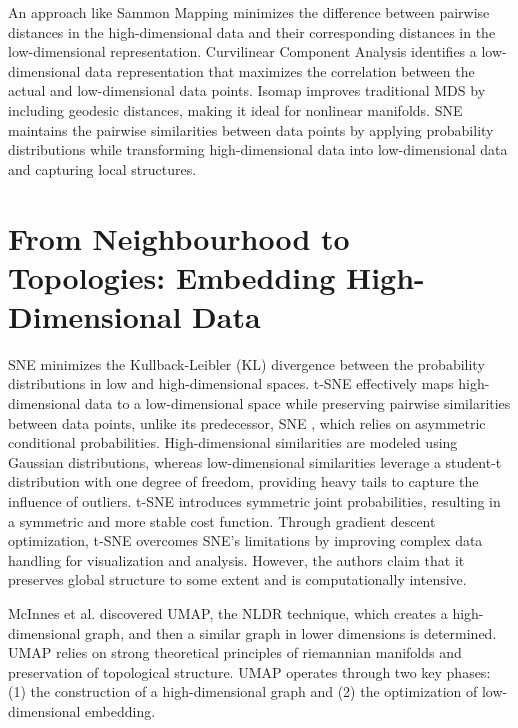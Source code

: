 An approach like Sammon Mapping \cite{henderson1997sammon} minimizes the difference between pairwise distances in the high-dimensional data and their corresponding distances in the low-dimensional representation. Curvilinear Component Analysis \cite{demartines1995cca} identifies a low-dimensional data representation that maximizes the correlation between the actual and low-dimensional data points. Isomap \cite{tenenbaum2000global} improves traditional MDS \cite{hout2013multidimensional} by including geodesic distances, making it ideal for nonlinear manifolds. SNE \cite{hinton2002stochastic} maintains the pairwise similarities between data points by applying probability distributions while transforming high-dimensional data into low-dimensional data and capturing local structures.

\section{From Neighbourhood to Topologies: Embedding High-Dimensional Data}

SNE \cite{hinton2002stochastic} minimizes the Kullback-Leibler (KL) divergence between the probability distributions in low and high-dimensional spaces. t-SNE \cite{tsne} effectively maps high-dimensional data to a low-dimensional space while preserving pairwise similarities between data points, unlike its predecessor, SNE \cite{hinton2002stochastic}, which relies on asymmetric conditional probabilities. High-dimensional similarities are modeled using Gaussian distributions, whereas low-dimensional similarities leverage a student-t distribution with one degree of freedom, providing heavy tails to capture the influence of outliers. t-SNE \cite{tsne} introduces symmetric joint probabilities, resulting in a symmetric and more stable cost function. Through gradient descent optimization, t-SNE \cite{tsne} overcomes SNE’s limitations by improving complex data handling for visualization and analysis. However, the authors claim that it preserves global structure to some extent and is computationally intensive.


McInnes et al. \cite{umap_reference} discovered UMAP, the NLDR technique, which creates a high-dimensional graph, and then a similar graph in lower dimensions is determined. UMAP relies on strong theoretical principles of riemannian manifolds \cite{lin2008riemannian} and preservation of topological structure. UMAP operates through two key phases: (1) the construction of a high-dimensional graph and (2) the optimization of low-dimensional embedding. 


